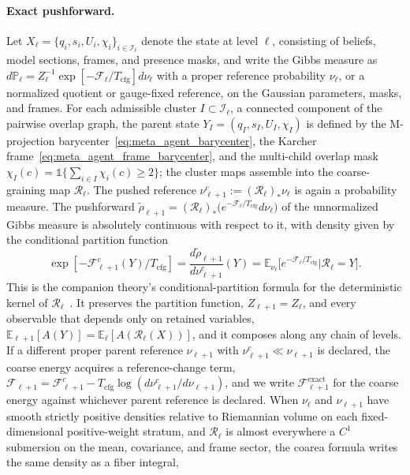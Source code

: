 \documentclass[11pt]{article}
\begin{document}
\paragraph{Exact pushforward.}
Let $X_\ell = \{q_i, s_i, U_i, \chi_i\}_{i \in \mathcal{I}_\ell}$ denote the state at level $\ell$, consisting of beliefs, model sections, frames, and presence masks, and write the Gibbs measure as $d\mathbb{P}_\ell = Z_\ell^{-1}\exp[-\mathcal{F}_\ell/T_{\mathrm{cfg}}]d\nu_\ell$ with a proper reference probability $\nu_\ell$, or a normalized quotient or gauge-fixed reference, on the Gaussian parameters, masks, and frames. For each admissible cluster $I \subset \mathcal{I}_\ell$, a connected component of the pairwise overlap graph, the parent state $Y_I = (q_I, s_I, U_I, \chi_I)$ is defined by the M-projection barycenter~\eqref{eq:meta_agent_barycenter}, the Karcher frame~\eqref{eq:meta_agent_frame_barycenter}, and the multi-child overlap mask $\chi_I(c) = \mathbb{1}\{\sum_{i \in I}\chi_i(c) \ge 2\}$; the cluster maps assemble into the coarse-graining map $\mathcal{R}_\ell$. The pushed reference $\nu^c_{\ell+1}:=(\mathcal{R}_\ell)_*\nu_\ell$ is again a probability measure. The pushforward $\widetilde{\rho}_{\ell+1} = (\mathcal{R}_\ell)_*\big(e^{-\mathcal{F}_\ell/T_{\mathrm{cfg}}}d\nu_\ell\big)$ of the unnormalized Gibbs measure is absolutely continuous with respect to it, with density given by the conditional partition function
\begin{equation}
\exp[-\mathcal{F}^{c}_{\ell+1}(Y)/T_{\mathrm{cfg}}]
=\frac{d\widetilde{\rho}_{\ell+1}}{d\nu^c_{\ell+1}}(Y)
=\mathbb{E}_{\nu_\ell}\big[e^{-\mathcal{F}_\ell/T_{\mathrm{cfg}}}\big|\mathcal{R}_\ell=Y\big].
\label{eq:rg_conditional_partition}
\end{equation}
This is the companion theory's conditional-partition formula for the deterministic kernel of $\mathcal{R}_\ell$~\cite[Ch.~11]{DennisGaugeVFE2026}. It preserves the partition function, $Z_{\ell+1} = Z_\ell$, and every observable that depends only on retained variables, $\mathbb{E}_{\ell+1}[A(Y)] = \mathbb{E}_\ell[A(\mathcal{R}_\ell(X))]$, and it composes along any chain of levels. If a different proper parent reference $\nu_{\ell+1}$ with $\nu^c_{\ell+1}\ll\nu_{\ell+1}$ is declared, the coarse energy acquires a reference-change term, $\mathcal{F}_{\ell+1}=\mathcal{F}^c_{\ell+1}-T_{\mathrm{cfg}}\log(d\nu^c_{\ell+1}/d\nu_{\ell+1})$, and we write $\mathcal{F}^{\mathrm{exact}}_{\ell+1}$ for the coarse energy against whichever parent reference is declared. When $\nu_\ell$ and $\nu_{\ell+1}$ have smooth strictly positive densities relative to Riemannian volume on each fixed-dimensional positive-weight stratum, and $\mathcal{R}_\ell$ is almost everywhere a $C^1$ submersion on the mean, covariance, and frame sector, the coarea formula writes the same density as a fiber integral,
\end{document}
